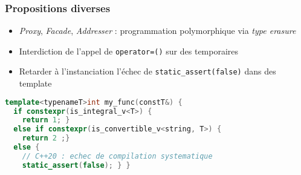 \documentclass[C++.tex]{subfiles}
\begin{document}
\begin{frame}[fragile]
	\frametitle{Propositions diverses}
	\begin{itemize}
		\item\textit{Proxy}, \textit{Facade}, \textit{Addresser} : programmation polymorphique via \textit{type erasure}


		\item Interdiction de l'appel de \lstinline|operator=()| sur des temporaires


		\item Retarder à l'instanciation l'échec de \lstinline|static_assert(false)| dans des template
	\end{itemize}

	\begin{lstlisting}[language=C++]
template<typenameT>int my_func(constT&) {
  if constexpr(is_integral_v<T>) { 
    return 1; } 
  else if constexpr(is_convertible_v<string, T>) { 
    return 2 ;}
  else {
    // C++20 : echec de compilation systematique
    static_assert(false); } }\end{lstlisting}

\end{frame}
\end{document}
